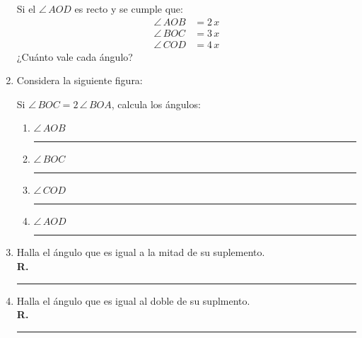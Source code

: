 \documentclass[12pt]{article}
\begin{document}
\begin{enumerate}
\begin{figure}[H]
\end{figure}
Si el $\angle \, AOD$ es recto y se cumple que:
\begin{align*}
\angle \, AOB &= 2 \, x \\
\angle \, BOC &= 3 \, x \\
\angle \, COD &= 4 \, x
\end{align*}
¿Cuánto vale cada ángulo?
\item Considera la siguiente figura:
\begin{figure}[H]
\centering
{}
\end{figure}
Si $\angle \, BOC = 2 \, \angle \, BOA$, calcula los ángulos:
\begin{enumerate}
\item $\angle \, AOB$ \hspace{1cm} \rule{1.5cm}{0.7pt}
\item $\angle \, BOC$ \hspace{1cm} \rule{1.5cm}{0.7pt}
\item $\angle \, COD$ \hspace{1cm} \rule{1.5cm}{0.7pt}
\item $\angle \, AOD$ \hspace{1cm} \rule{1.5cm}{0.7pt}
\end{enumerate}
\item Halla el ángulo que es igual a la mitad de su suplemento.
\\ \textbf{R.} \rule{4cm}{0.7pt}
\item Halla el ángulo que es igual al doble de su suplmento.
\\ \textbf{R.} \rule{4cm}{0.7pt}
\end{enumerate}
\end{document}
